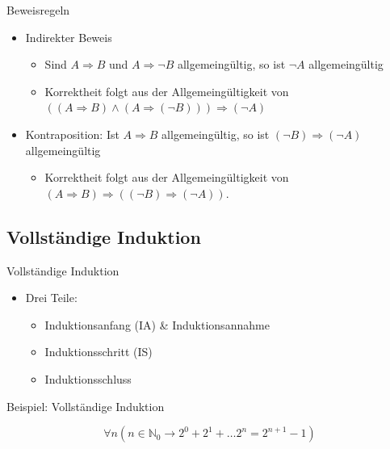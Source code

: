 \documentclass[12pt%
,aspectratio=169%
]{beamer}
\begin{document}
\begin{frame}{Beweisregeln}
\begin{itemize}
\item Indirekter Beweis
	\begin{itemize}
		\item Sind $A \Rightarrow B$ und $A \Rightarrow \neg B$ allgemeingültig, so ist $\neg A$ allgemeingültig
		\item Korrektheit folgt aus der Allgemeingültigkeit von $((A \Rightarrow B) \land (A \Rightarrow (\neg B))) \Rightarrow (\neg A)$
	\end{itemize}
	\item Kontraposition:  Ist $A \Rightarrow B$ allgemeingültig, so ist $(\neg B) \Rightarrow (\neg A)$ allgemeingültig
	\begin{itemize}
		\item Korrektheit folgt aus der Allgemeingültigkeit von $(A \Rightarrow B) \Rightarrow ((\neg B) \Rightarrow (\neg A))$.
	\end{itemize}
\end{itemize}
\end{frame}

\subsection{Vollständige Induktion}
\begin{frame}{Vollständige Induktion}
\begin{itemize}
	\item Drei Teile: 
	\begin{itemize}
		\item Induktionsanfang (IA) \& Induktionsannahme
		\item Induktionsschritt (IS)
		\item Induktionsschluss
	\end{itemize}
\end{itemize}
\end{frame}

\begin{frame}{Beispiel: Vollständige Induktion}
\begin{theorem}
$$\forall n (n \in \mathbb{N}_0 \rightarrow 2^0 + 2^1 + \dots 2^n = 2^{n+1}-1)$$
\end{theorem}
\end{frame}
\end{document}
